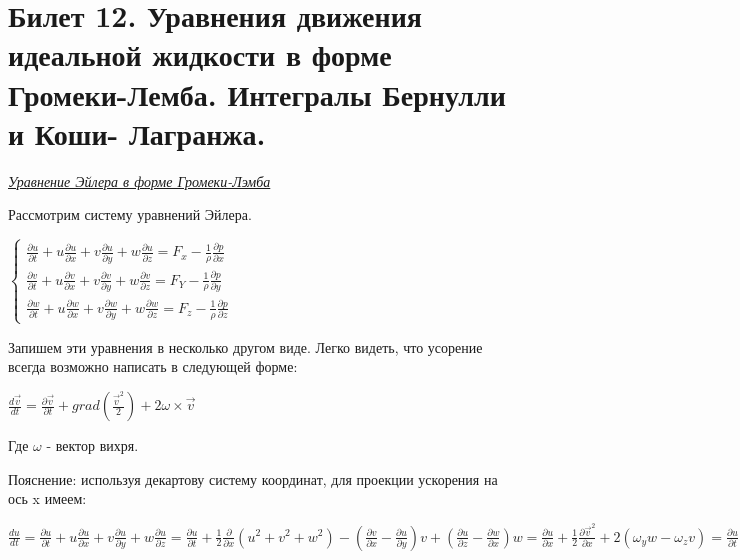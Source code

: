 \newpage
\section{Билет 12. Уравнения движения идеальной жидкости в форме Громеки-Лемба. Интегралы Бернулли и Коши- Лагранжа.}

\begin{center}
	\textit{\underline{Уравнение Эйлера в форме Громеки-Лэмба}}
\end{center}
Рассмотрим систему уравнений Эйлера.
\begin{center}
	$\begin{cases}
		\frac{\partial u}{\partial t} + u\frac{\partial u}{\partial x} + v\frac{\partial u}{\partial y} + w\frac{\partial u}{\partial z} = F_x - \frac{1}{\rho}\frac{\partial p}{\partial x}\\
		\frac{\partial v}{\partial t} + u\frac{\partial v}{\partial x} + v\frac{\partial v}{\partial y} + w\frac{\partial v}{\partial z} = F_Y - \frac{1}{\rho}\frac{\partial p}{\partial y}\\
		\frac{\partial w}{\partial t} + u\frac{\partial w}{\partial x} + v\frac{\partial w}{\partial y} + w\frac{\partial w}{\partial z} = F_z - \frac{1}{\rho}\frac{\partial p}{\partial z}
	\end{cases}$
\end{center}
Запишем эти уравнения в несколько другом виде. Легко видеть, что усорение всегда возможно написать в следующей форме:
\begin{center}
	$\frac{d \vec{v}}{dt} = \frac{\partial \vec{v}}{\partial t} + grad(\frac{\vec{v}^2}{2}) + 2 \omega \times \vec{v}$
\end{center}
Где $\omega$ - вектор вихря.

Пояснение: используя декартову систему координат, для проекции ускорения на ось x имеем:
\begin{center}
	$\frac{du}{dt} = \frac{\partial u}{\partial t} + u \frac{\partial u}{\partial x} + v \frac{\partial u}{\partial y} + w \frac{\partial u}{\partial z} = \frac{\partial u}{\partial t} + \frac{1}{2}\frac{\partial}{\partial x}\left(u^2 + v^2 + w^2\right) - (\frac{\partial v}{\partial x} - \frac{\partial u}{\partial y}) v + (\frac{\partial u}{\partial z} - \frac{\partial w}{\partial x})w = \frac{\partial u}{\partial x} + \frac{1}{2}\frac{\partial \vec{v}^2}{\partial x} + 2(\omega_yw - \omega_zv) = \frac{\partial u}{\partial t} + \frac{1}{2}\frac{\partial \vec{v}^2}{\partial x} + 2(\omega \times v)_x$
\end{center}

